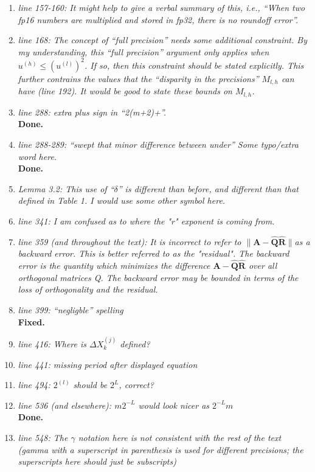 \documentclass[final,onefignum,onetabnum]{siamart190516}
\newcommand{\bb}[1]{\mathbf{#1}}
\begin{document}
\begin{enumerate}
    {\bf Done.}
    \item {\it line 157-160: It might help to give a verbal summary of this, i.e., ``When two fp16 numbers are multiplied and stored in fp32, there is no roundoff error''. }
    \item {\it line 168: The concept of ``full precision'' needs some additional constraint. By my understanding, this ``full precision'' argument only applies when $u^{(h)} \leq (u^{(l)})^2$. If so, then this constraint should be stated explicitly. This further contrains the values that the ``disparity in the precisions'' $M_{l,h}$ can have (line 192). It would be good to state these bounds on $M_{l,h}$. }
    \item {\it line 288: extra plus sign in ``2(m+2)+''. }\\
    {\bf Done.}
    \item {\it line 288-289: ``swept that minor difference between under'' Some typo/extra word here. }\\
    {\bf Done.}
    \item {\it Lemma 3.2: This use of ``$\delta$'' is different than before, and different than that defined in Table 1. I would use some other symbol here. }
    \item {\it line 341: I am confused as to where the "r" exponent is coming from. }
    \item {\it line 359 (and throughout the text): It is incorrect to refer to $\|\bb{A}-\hat{\bb{Q}}\hat{\bb{R}}\|$as a backward error. This is better referred to as the "residual". The backward error is the quantity which minimizes the difference $\bb{A}-\hat{\bb{Q}}\hat{\bb{R}}$ over all orthogonal matrices Q. The backward error may be bounded in terms of the loss of orthogonality and the residual. }
    \item {\it line 399: ``negligble'' spelling }\\
    {\bf Fixed.}
    \item {\it line 416: Where is $\Delta X_k^{(j)}$ defined? }
    \item {\it line 441: missing period after displayed equation }
    \item {\it line 494: $2^{(l)}$ should be $2^L$, correct? }
    \item {\it line 536 (and elsewhere): $m2^{-L}$ would look nicer as $2^{-L}m$ }\\
    {\bf Done.}
    \item {\it line 548: The $\gamma$ notation here is not consistent with the rest of the text (gamma with a superscript in parenthesis is used for different precisions; the superscripts here should just be subscripts) }

\end{enumerate}
\end{document}

